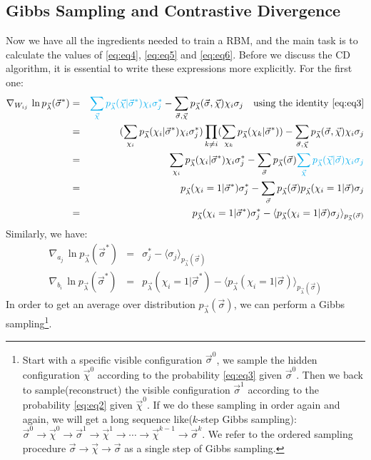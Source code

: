 \documentclass[letterpaper, 10pt]{article}
\newcommand{\qbar}{\rangle}
\newcommand{\qket}{\langle}
\begin{document}
\subsection{Gibbs Sampling and Contrastive Divergence}
Now we have all the ingredients needed to train a RBM, 
and the main task is to calculate the values of \ref{eq:eq4}, \ref{eq:eq5} and \ref{eq:eq6}. 
Before we discuss the CD algorithm, it is essential to write these expressions more explicitly. 
For the first one:
\begin{eqnarray}
\nabla_{W_{ij}} \, \ln{p_{\vec{\lambda}}(\vec{\sigma}^*)} 
& = & {\color{cyan}{\sum_{\vec{\chi}} p_{\vec{\lambda}}(\vec{\chi} | \vec{\sigma}^*) \chi_i \sigma_j^*}} - 
\sum_{\vec{\sigma},\vec{\chi}} p_{\vec{\lambda}}(\vec{\sigma},\vec{\chi}) \chi_i \sigma_j 
\quad{} \textrm{using the identity}\,\, \ref{eq:eq3} \nonumber\\
& = & ( \sum_{\chi_i} p_{\vec{\lambda}}(\chi_i | \vec{\sigma}^*) \chi_i \sigma_j^* ) 
\prod_{k \neq i} (\sum_{\chi_k} p_{\vec{\lambda}}(\chi_k | \vec{\sigma}^*)) - 
\sum_{\vec{\sigma},\vec{\chi}} p_{\vec{\lambda}}(\vec{\sigma},\vec{\chi}) \chi_i \sigma_j  \nonumber\\
& = & \sum_{\chi_i} p_{\vec{\lambda}}(\chi_i | \vec{\sigma}^*) \chi_i \sigma_j^* - 
\sum_{\vec{\sigma}} p_{\vec{\lambda}}(\vec{\sigma}) {\color{cyan}{\sum_{\vec{\chi}} 
p_{\vec{\lambda}}(\vec{\chi} | \vec{\sigma}) \chi_i \sigma_j}} \nonumber\\
& = & p_{\vec{\lambda}}(\chi_i=1 | \vec{\sigma}^*) \sigma_j^* - 
\sum_{\vec{\sigma}} p_{\vec{\lambda}}(\vec{\sigma}) p_{\vec{\lambda}}(\chi_i=1 | \vec{\sigma}) \sigma_j \nonumber\\
& = & p_{\vec{\lambda}}(\chi_i=1 | \vec{\sigma}^*) \sigma_j^* - 
\qket p_{\vec{\lambda}}(\chi_i=1 | \vec{\sigma}) \sigma_j \qbar_{p_{\vec{\lambda}}(\vec{\sigma})}\label{eq:eq7}
\end{eqnarray}
Similarly, we have:
\begin{eqnarray}
\nabla_{a_j} \, \ln{p_{\vec{\lambda}}(\vec{\sigma}^*)} 
& = & \sigma_j^* - \qket \sigma_j \qbar_{p_{\vec{\lambda}}(\vec{\sigma})}\label{eq:eq8} \\
\nabla_{b_i} \, \ln{p_{\vec{\lambda}}(\vec{\sigma}^*)} 
& = & p_{\vec{\lambda}}(\chi_i=1 | \vec{\sigma}^*) - 
\qket p_{\vec{\lambda}}(\chi_i=1 | \vec{\sigma})\qbar_{p_{\vec{\lambda}}(\vec{\sigma})}\label{eq:eq9}
\end{eqnarray}
In order to get an average over distribution $ p_{\vec{\lambda}}(\vec{\sigma}) $, 
we can perform a Gibbs sampling\footnote{Start with a specific visible configuration $ \vec{\sigma}^0 $, 
we sample the hidden configuration $ \vec{\chi}^0 $ according to the probability \ref{eq:eq3} given $ \vec{\sigma}^0 $. 
Then we back to sample(reconstruct) the visible configuration $ \vec{\sigma}^1 $ 
according to the probability \ref{eq:eq2} given $ \vec{\chi}^0 $. 
If we do these sampling in order again and again, we will get a long sequence like($ k $-step Gibbs sampling): 
$ \vec{\sigma}^0 \rightarrow \vec{\chi}^0 \rightarrow \vec{\sigma}^1 
\rightarrow \vec{\chi}^1 \rightarrow \cdots \rightarrow \vec{\chi}^{k-1} \rightarrow \vec{\sigma}^k $. 
We refer to the ordered sampling procedure $ \vec{\sigma} \rightarrow \vec{\chi} \rightarrow \vec{\sigma} $ 
as a single step of Gibbs sampling.}. 
\end{document}
